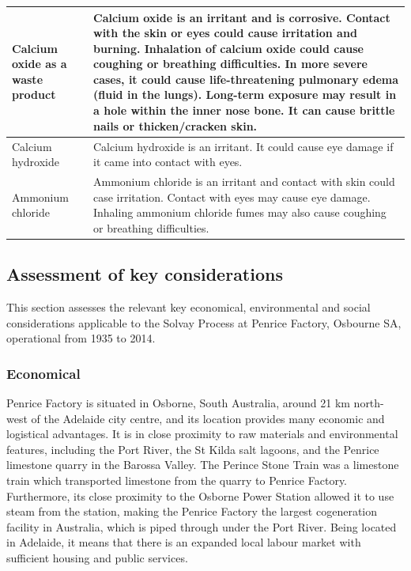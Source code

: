 \documentclass[12pt, a4paper]{article}
\begin{document}
\begin{table}[H]
\begin{tabular}{|p{5cm}|p{12cm}|}
Calcium oxide as a waste product & Calcium oxide is an irritant and is corrosive. Contact with the skin or eyes could cause irritation and burning. Inhalation of calcium oxide could cause coughing or breathing difficulties.  In more severe cases, it could cause life-threatening pulmonary edema (fluid in the lungs). Long-term exposure may result in a hole within the inner nose bone. It can cause brittle nails or thicken/cracken skin. \\  \hline
Calcium hydroxide                & Calcium hydroxide is an irritant. It could cause eye damage if it came into contact with eyes.                                                                                                                                                                                                                                                                                                                    \\  \hline
Ammonium chloride                & Ammonium chloride is an irritant and contact with skin could case irritation. Contact with eyes may cause eye damage. Inhaling ammonium chloride fumes may also cause coughing or breathing difficulties.

\\ \hline                                                 

\end{tabular}
\end{table}


\subsection{Assessment of key considerations}

This section assesses the relevant key economical, environmental and social considerations applicable to the Solvay Process at Penrice Factory, Osbourne SA, operational from 1935 to 2014.

\subsubsection{Economical}

Penrice Factory is situated in Osborne, South Australia, around 21 km north-west of the Adelaide city centre, and its location provides many economic and logistical advantages. It is in close proximity to raw materials and environmental features, including the Port River, the St Kilda salt lagoons, and the Penrice limestone quarry in the Barossa Valley. The Perince Stone Train was a limestone train which transported limestone from the quarry to Penrice Factory. Furthermore, its close proximity to the Osborne Power Station allowed it to use steam from the station, making the Penrice Factory the largest cogeneration facility in Australia, which is piped through under the Port River. Being located in Adelaide, it means that there is an expanded local labour market with sufficient housing and public services.
\end{document}
